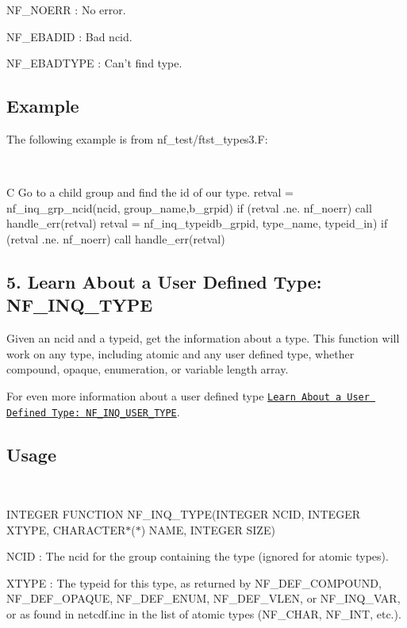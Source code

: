 {\ttfamily N\+F\+\_\+\+N\+O\+E\+RR} \+: No error.

{\ttfamily N\+F\+\_\+\+E\+B\+A\+D\+ID} \+: Bad ncid.

{\ttfamily N\+F\+\_\+\+E\+B\+A\+D\+T\+Y\+PE} \+: Can’t find type.

\subsection*{Example }

The following example is from nf\+\_\+test/ftst\+\_\+types3.\+F\+:

 

C Go to a child group and find the id of our type. retval = nf\+\_\+inq\+\_\+grp\+\_\+ncid(ncid, group\+\_\+name,b\+\_\+grpid) if (retval .ne. nf\+\_\+noerr) call handle\+\_\+err(retval) retval = nf\+\_\+inq\+\_\+typeidb\+\_\+grpid, type\+\_\+name, typeid\+\_\+in) if (retval .ne. nf\+\_\+noerr) call handle\+\_\+err(retval)\hypertarget{nc_f77_interface_guide_f77_NF-INQ-TYPE}{}\subsection{5. Learn About a User Defined Type\+: N\+F\+\_\+\+I\+N\+Q\+\_\+\+T\+Y\+P\+E }\label{nc_f77_interface_guide_f77_NF-INQ-TYPE}
Given an ncid and a typeid, get the information about a type. This function will work on any type, including atomic and any user defined type, whether compound, opaque, enumeration, or variable length array.

For even more information about a user defined type \href{#NF_005fINQ_005fUSER_005fTYPE}{\tt Learn About a User Defined Type\+: N\+F\+\_\+\+I\+N\+Q\+\_\+\+U\+S\+E\+R\+\_\+\+T\+Y\+PE}.

\subsection*{Usage }

 

I\+N\+T\+E\+G\+ER F\+U\+N\+C\+T\+I\+ON N\+F\+\_\+\+I\+N\+Q\+\_\+\+T\+Y\+PE(I\+N\+T\+E\+G\+ER N\+C\+ID, I\+N\+T\+E\+G\+ER X\+T\+Y\+PE, C\+H\+A\+R\+A\+C\+T\+E\+R$\ast$($\ast$) N\+A\+ME, I\+N\+T\+E\+G\+ER S\+I\+ZE)

{\ttfamily N\+C\+ID} \+: The ncid for the group containing the type (ignored for atomic types).

{\ttfamily X\+T\+Y\+PE} \+: The typeid for this type, as returned by N\+F\+\_\+\+D\+E\+F\+\_\+\+C\+O\+M\+P\+O\+U\+ND, N\+F\+\_\+\+D\+E\+F\+\_\+\+O\+P\+A\+Q\+UE, N\+F\+\_\+\+D\+E\+F\+\_\+\+E\+N\+UM, N\+F\+\_\+\+D\+E\+F\+\_\+\+V\+L\+EN, or N\+F\+\_\+\+I\+N\+Q\+\_\+\+V\+AR, or as found in netcdf.\+inc in the list of atomic types (N\+F\+\_\+\+C\+H\+AR, N\+F\+\_\+\+I\+NT, etc.).

